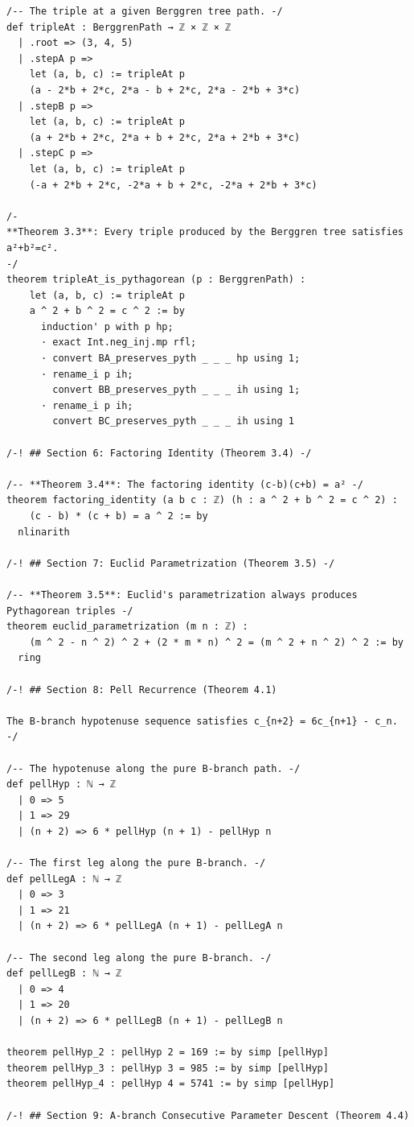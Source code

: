 \documentclass[11pt,openany]{book}
\theoremstyle{definition}
\theoremstyle{plain}
\theoremstyle{remark}
\begin{document}
\begin{lstlisting}[style=lean]
/-- The triple at a given Berggren tree path. -/
def tripleAt : BerggrenPath → ℤ × ℤ × ℤ
  | .root => (3, 4, 5)
  | .stepA p =>
    let (a, b, c) := tripleAt p
    (a - 2*b + 2*c, 2*a - b + 2*c, 2*a - 2*b + 3*c)
  | .stepB p =>
    let (a, b, c) := tripleAt p
    (a + 2*b + 2*c, 2*a + b + 2*c, 2*a + 2*b + 3*c)
  | .stepC p =>
    let (a, b, c) := tripleAt p
    (-a + 2*b + 2*c, -2*a + b + 2*c, -2*a + 2*b + 3*c)

/-
**Theorem 3.3**: Every triple produced by the Berggren tree satisfies a²+b²=c².
-/
theorem tripleAt_is_pythagorean (p : BerggrenPath) :
    let (a, b, c) := tripleAt p
    a ^ 2 + b ^ 2 = c ^ 2 := by
      induction' p with p hp;
      · exact Int.neg_inj.mp rfl;
      · convert BA_preserves_pyth _ _ _ hp using 1;
      · rename_i p ih;
        convert BB_preserves_pyth _ _ _ ih using 1;
      · rename_i p ih;
        convert BC_preserves_pyth _ _ _ ih using 1

/-! ## Section 6: Factoring Identity (Theorem 3.4) -/

/-- **Theorem 3.4**: The factoring identity (c-b)(c+b) = a² -/
theorem factoring_identity (a b c : ℤ) (h : a ^ 2 + b ^ 2 = c ^ 2) :
    (c - b) * (c + b) = a ^ 2 := by
  nlinarith

/-! ## Section 7: Euclid Parametrization (Theorem 3.5) -/

/-- **Theorem 3.5**: Euclid's parametrization always produces Pythagorean triples -/
theorem euclid_parametrization (m n : ℤ) :
    (m ^ 2 - n ^ 2) ^ 2 + (2 * m * n) ^ 2 = (m ^ 2 + n ^ 2) ^ 2 := by
  ring

/-! ## Section 8: Pell Recurrence (Theorem 4.1)

The B-branch hypotenuse sequence satisfies c_{n+2} = 6c_{n+1} - c_n. -/

/-- The hypotenuse along the pure B-branch path. -/
def pellHyp : ℕ → ℤ
  | 0 => 5
  | 1 => 29
  | (n + 2) => 6 * pellHyp (n + 1) - pellHyp n

/-- The first leg along the pure B-branch. -/
def pellLegA : ℕ → ℤ
  | 0 => 3
  | 1 => 21
  | (n + 2) => 6 * pellLegA (n + 1) - pellLegA n

/-- The second leg along the pure B-branch. -/
def pellLegB : ℕ → ℤ
  | 0 => 4
  | 1 => 20
  | (n + 2) => 6 * pellLegB (n + 1) - pellLegB n

theorem pellHyp_2 : pellHyp 2 = 169 := by simp [pellHyp]
theorem pellHyp_3 : pellHyp 3 = 985 := by simp [pellHyp]
theorem pellHyp_4 : pellHyp 4 = 5741 := by simp [pellHyp]

/-! ## Section 9: A-branch Consecutive Parameter Descent (Theorem 4.4)


\end{lstlisting}
\end{document}
